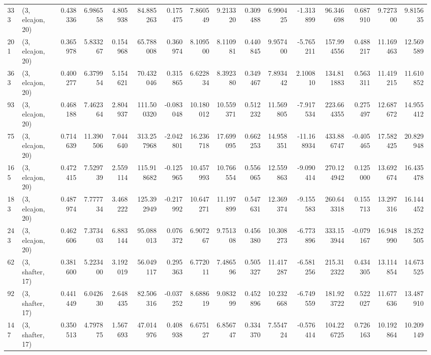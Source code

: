 \begin{tabular}{llrrrrrrrrrrrrrr}
333 &  (3, elcajon, 20) &   0.438336 &   6.986558 &   4.805938 &    84.885263 &   0.175475 &   7.860549 &   9.213320 &  0.309488 &   6.990425 &  -1.313899 &    96.346698 &   0.687910 &   9.727300 &   9.815635 \\
201 &  (3, elcajon, 20) &   0.365978 &   5.833267 &   0.154968 &    65.788008 &   0.360974 &   8.109500 &   8.110981 &  0.440845 &   9.957400 &  -5.765211 &   157.994556 &   0.488217 &  11.169463 &  12.569589 \\
363 &  (3, elcajon, 20) &   0.400277 &   6.379954 &   5.154621 &    70.432046 &   0.315865 &   6.622834 &   8.392380 &  0.349467 &   7.893442 &   2.100810 &   134.811883 &   0.563311 &  11.419215 &  11.610852 \\
93  &  (3, elcajon, 20) &   0.468188 &   7.462364 &   2.804937 &   111.500320 &  -0.083048 &  10.180012 &  10.559371 &  0.512232 &  11.569805 &  -7.917534 &   223.664355 &   0.275497 &  12.687672 &  14.955412 \\
75  &  (3, elcajon, 20) &   0.714639 &  11.390506 &   7.044640 &   313.257968 &  -2.042801 &  16.236718 &  17.699095 &  0.662253 &  14.958351 & -11.168934 &   433.886747 &  -0.405465 &  17.582425 &  20.829948 \\
165 &  (3, elcajon, 20) &   0.472415 &   7.529739 &   2.559114 &   115.918682 &  -0.125965 &  10.457993 &  10.766554 &  0.556065 &  12.559863 &  -9.090414 &   270.124942 &   0.125000 &  13.692674 &  16.435478 \\
183 &  (3, elcajon, 20) &   0.487974 &   7.777734 &   3.468222 &   125.392949 &  -0.217992 &  10.647271 &  11.197899 &  0.547631 &  12.369374 &  -9.155583 &   260.643318 &   0.155713 &  13.297316 &  16.144452 \\
243 &  (3, elcajon, 20) &   0.462606 &   7.373403 &   6.883144 &    95.088013 &   0.076372 &   6.907267 &   9.751308 &  0.456380 &  10.308273 &  -6.773896 &   333.153944 &  -0.079167 &  16.948990 &  18.252505 \\
62  &  (3, shafter, 17) &   0.381600 &   5.223400 &   3.192019 &    56.049117 &   0.295363 &   6.772011 &   7.486596 &  0.505327 &  11.417287 &  -6.581256 &   215.312322 &   0.434305 &  13.114854 &  14.673525 \\
92  &  (3, shafter, 17) &   0.441449 &   6.042630 &   2.648435 &    82.506316 &  -0.037252 &   8.688619 &   9.083299 &  0.452896 &  10.232668 &  -6.749559 &   181.923722 &   0.522027 &  11.677636 &  13.487910 \\
147 &  (3, shafter, 17) &   0.350513 &   4.797875 &   1.567693 &    47.014976 &   0.408938 &   6.675127 &   6.856747 &  0.334370 &   7.554724 &  -0.576414 &   104.226725 &   0.726163 &  10.192864 &  10.209149 \\

\end{tabular}
